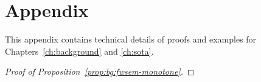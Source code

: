 
\chapter{Appendix}
This appendix contains technical details of proofs and examples for Chapters~\ref{ch:background} and \ref{ch:sota}.

\begin{proof}[Proof of Proposition~\ref{prop:bg:fwsem-monotone}]
\end{proof}
